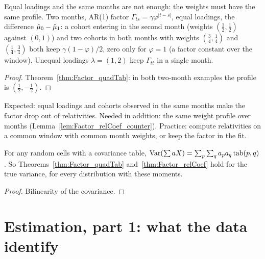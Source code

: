 \begin{lemma}[Counterexamples]\label{lem:Factor_relCoef_counter}
  \leanok
  Equal loadings and the same months are not enough: the weights must have the same profile.
  Two months, AR(1) factor $\Gamma_{ts} = \gamma\varphi^{|t-s|}$, equal loadings, the difference
  $\hat\mu_0 - \hat\mu_1$: a cohort entering in the second month (weights $(\tfrac12,\tfrac12)$ against
  $(0, 1)$) and two cohorts in both months with weights $(\tfrac34,\tfrac14)$ and
  $(\tfrac14,\tfrac34)$ both keep $\gamma(1-\varphi)/2$, zero only for $\varphi = 1$ (a factor
  constant over the window). Unequal loadings $\lambda = (1, 2)$ keep $\Gamma_{tt}$ in a single
  month.
\end{lemma}
\begin{proof}
  \leanok
  Theorem~\ref{thm:Factor_quadTab}: in both two-month examples the profile is
  $(\tfrac12, -\tfrac12)$.
\end{proof}

\begin{remark}[Finding 31]
  Expected: equal loadings and cohorts observed in the same months make the factor drop out of
  relativities. Needed in addition: the same weight profile over months
  (Lemma~\ref{lem:Factor_relCoef_counter}). Practice: compute relativities on a common window
  with common month weights, or keep the factor in the fit.
\end{remark}

\begin{theorem}\label{thm:Factor_rel_true}
  \leanok
  For any random cells with a covariance table, $\operatorname{Var}(\sum aX) = \sum_p\sum_q a_pa_q\,
  \mathrm{tab}(p,q)$. So Theorems~\ref{thm:Factor_quadTab} and~\ref{thm:Factor_relCoef} hold
  for the true variance, for every distribution with these moments.
\end{theorem}
\begin{proof}
  \leanok
  Bilinearity of the covariance.
\end{proof}

\section*{Estimation, part 1: what the data identify}

